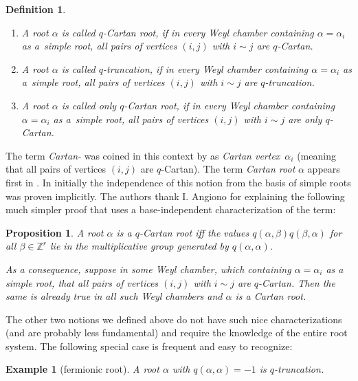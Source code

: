 \documentclass[pdftex]{sigma}%
\numberwithin{equation}{section}
\newtheorem{prop}[teo]{Proposition}
\newtheorem{defin}[teo]{Definition}
\newtheorem{ese}[teo]{Example}
\newcommand{\Z}{\mathbb{Z}}
\begin{document}
\begin{defin} \label{def_qCartanRoot}\quad
\begin{enumerate}\itemsep=0pt
	\item A root $\alpha$ is called \emph{$q$-Cartan root}, if in every Weyl chamber containing $\alpha=\alpha_i$ as a~simple root, all pairs of vertices $(i,j)$ with $i\sim j$ are $q$-Cartan.
	\item A root $\alpha$ is called \emph{$q$-truncation}, if in every Weyl chamber containing $\alpha=\alpha_i$ as a~simple root, all pairs of vertices $(i,j)$ with $i\sim j$ are $q$-truncation.
	\item A root $\alpha$ is called \emph{only $q$-Cartan root}, if in every Weyl chamber containing $\alpha=\alpha_i$ as a~simple root, all pairs of vertices $(i,j)$ with $i\sim j$ are only $q$-Cartan.
\end{enumerate}
\end{defin}
The term \emph{Cartan-} was coined in this context by \cite{Ang13} as \emph{Cartan vertex}~$\alpha_i$ (meaning that all pairs of vertices $(i,j)$ are $q$-Cartan). The term \emph{Cartan root} $\alpha$ appears first in \cite{Ang16}. In \cite{AAR19} initially the independence of this notion from the basis of simple roots was proven implicitly. The authors thank I. Angiono for explaining the following much simpler proof that uses a base-independent characterization of the term: 	
\begin{prop}\label{prop_IvanCartanRoot} A root
	$\alpha$ is a $q$-Cartan root iff the values $q(\alpha,\beta)q(\beta,\alpha)$ for all $\beta\in\Z^r$ lie in the multiplicative group generated by $q(\alpha,\alpha)$.
	
	As a consequence, suppose in some Weyl chamber, which containing $\alpha=\alpha_i$ as a simple root, that all pairs of vertices $(i,j)$ with $i\sim j$ are $q$-Cartan. Then the same is already true in all such Weyl chambers and $\alpha$ is a Cartan root.
\end{prop}
The other two notions we defined above do not have such nice characterizations (and are probably less fundamental) and require the knowledge of the entire root system. The following special case is frequent and easy to recognize:
\begin{ese}[fermionic root]
	A root $\alpha$ with $q(\alpha,\alpha)=-1$ is $q$-truncation.
\end{ese}
\end{document}
